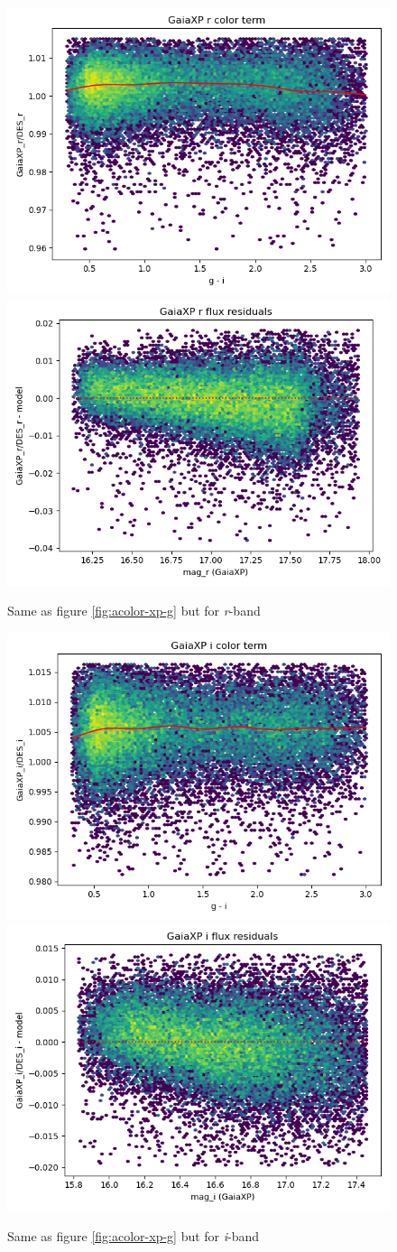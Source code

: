 \begin{figure}
    \includegraphics[width=0.49\linewidth]{./figures/color_terms/GaiaXP_to_DES_band_r_color_term.png}
    \includegraphics[width=0.49\linewidth]{./figures/color_terms/GaiaXP_to_DES_band_r_flux_residuals.png}
    \caption{Same as figure \ref{fig:acolor-xp-g} but for \textit{r}-band}
\end{figure}
\begin{figure}
    \includegraphics[width=0.49\linewidth]{./figures/color_terms/GaiaXP_to_DES_band_i_color_term.png}
    \includegraphics[width=0.49\linewidth]{./figures/color_terms/GaiaXP_to_DES_band_i_flux_residuals.png}
    \caption{Same as figure \ref{fig:acolor-xp-g} but for \textit{i}-band}
\end{figure}

